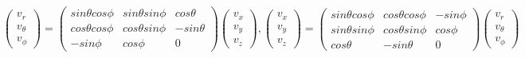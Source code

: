 \documentclass{article}
\begin{document}
\[
\begin{pmatrix}
    v_r \\
    v_\theta \\
    v_\phi
\end{pmatrix}
= 
\begin{pmatrix}
    sin\theta cos\phi & sin\theta sin\phi & cos\theta \\
    cos\theta cos\phi & cos\theta sin\phi & -sin\theta \\
    -sin\phi & cos\phi & 0
\end{pmatrix}
\begin{pmatrix}
    v_x \\
    v_y \\
    v_z
\end{pmatrix}
,
\begin{pmatrix}
    v_x \\
    v_y \\
    v_z
\end{pmatrix}
=
\begin{pmatrix}
    sin\theta cos\phi & cos\theta cos\phi & -sin\phi \\
    sin\theta sin\phi & cos\theta sin\phi & cos\phi \\
    cos\theta & -sin\theta & 0
\end{pmatrix}
\begin{pmatrix}
    v_r \\
    v_\theta \\
    v_\phi
\end{pmatrix}
\]
\end{document}
